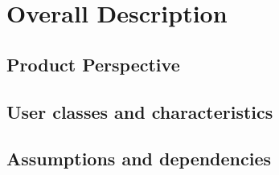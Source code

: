 \section{Overall Description}
\subsection{Product Perspective}
\subsection{User classes and characteristics}
\subsection{Assumptions and dependencies}

